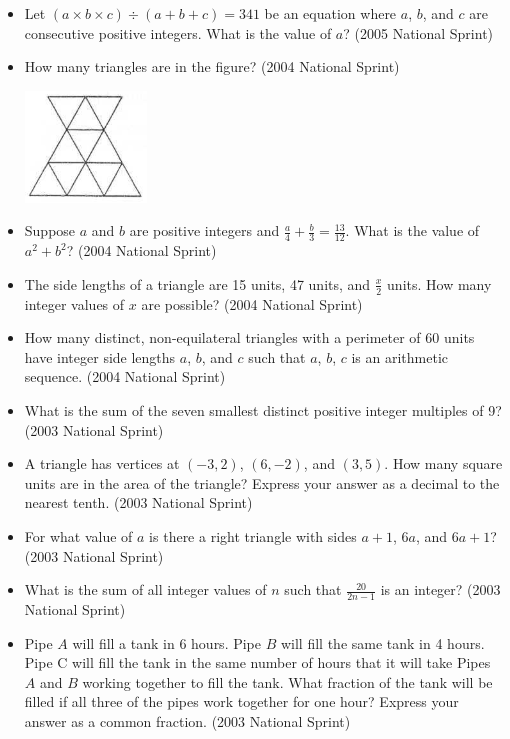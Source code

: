 \documentclass{article}
\begin{document}
\begin{itemize}
\begin{itemize}
\item Let $(a\times b\times c)\div (a+b+c)=341$ be an equation where $a$, $b$, and $c$ are consecutive positive integers. What is the value of $a$? (2005 National Sprint)

\item How many triangles are in the figure? (2004 National Sprint)

\includegraphics{2004Triangles.png}

\item Suppose $a$ and $b$ are positive integers and $\frac{a}{4}+\frac{b}{3}=\frac{13}{12}$. What is the value of $a^2+b^2$? (2004 National Sprint)

\item The side lengths of a triangle are 15 units, 47 units, and $\frac{x}{2}$ units. How many integer values of $x$ are possible? (2004 National Sprint)

\item How many distinct, non-equilateral triangles with a perimeter of 60 units have integer side lengths $a$, $b$, and $c$ such that $a$, $b$, $c$ is an arithmetic sequence. (2004 National Sprint)

\item What is the sum of the seven smallest distinct positive integer multiples of 9? (2003  National Sprint)

\item A triangle has vertices at $(-3,2)$, $(6,-2)$, and $(3,5)$. How many square units are in the area of the triangle? Express your answer as a decimal to the nearest tenth. (2003 National Sprint)

\item For what value of $a$ is there a right triangle with sides $a+1$, $6a$, and $6a+1$? (2003 National Sprint)

\item What is the sum of all integer values of $n$ such that $\frac{20}{2n-1}$ is an integer? (2003 National Sprint)

\item Pipe $A$ will fill a tank in 6 hours. Pipe $B$ will fill the same tank in 4 hours. Pipe C will fill the tank in the same number of hours that it will take Pipes $A$ and $B$ working together to fill the tank. What fraction of the tank will be filled if all three of the pipes work together for one hour? Express your answer as a common fraction. (2003 National Sprint)


\end{itemize}
\end{itemize}
\end{document}
